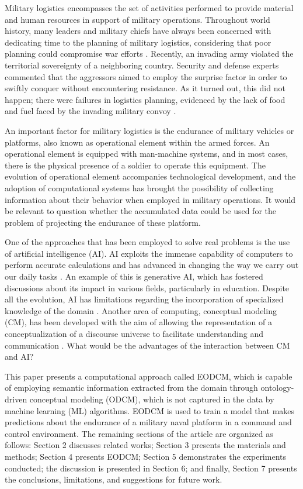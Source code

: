 \documentclass[
]{ceurart}
\begin{document}
Military logistics encompasses the set of activities performed to provide material and human resources in support of military operations. Throughout world history, many leaders and military chiefs have always been concerned with dedicating time to the planning of military logistics, considering that poor planning could compromise war efforts \cite{simon2001art}. Recently, an invading army violated the territorial sovereignty of a neighboring country. Security and defense experts commented that the aggressors aimed to employ the surprise factor in order to swiftly conquer without encountering resistance. As it turned out, this did not happen; there were failures in logistics planning, evidenced by the lack of food and fuel faced by the invading military convoy \cite{comboio2023reportagem}.
\par An important factor for military logistics is the endurance of military vehicles or platforms, also known as operational element within the armed forces. An operational element is equipped with man-machine systems, and in most cases, there is the physical presence of a soldier to operate this equipment. The evolution of operational element accompanies technological development, and the adoption of computational systems has brought the possibility of collecting information about their behavior when employed in military operations. It would be relevant to question whether the accumulated data could be used for the problem of projecting the endurance of these platform.
\par One of the approaches that has been employed to solve real problems is the use of artificial intelligence (AI). AI exploits the immense capability of computers to perform accurate calculations and has advanced in changing the way we carry out our daily tasks \cite{russell2013IA}. An example of this is generative AI, which has fostered discussions about its impact in various fields, particularly in education. Despite all the evolution, AI has limitations regarding the incorporation of specialized knowledge of the domain \cite{bork2023conceptual}. Another area of computing, conceptual modeling (CM), has been developed with the aim of allowing the representation of a conceptualization of a discourse universe to facilitate understanding and communication \cite{mylopoulos1992conceptual}. What would be the advantages of the interaction between CM and AI?
\par This paper presents a computational approach called EODCM, which is capable of employing semantic information extracted from the domain through ontology-driven conceptual modeling (ODCM), which is not captured in the data by machine learning (ML) algorithms. EODCM is used to train a model that makes predictions about the endurance of a military naval platform in a command and control environment. The remaining sections of the article are organized as follows: Section 2 discusses related works; Section 3 presents the materials and methods; Section 4 presents EODCM; Section 5 demonstrates the experiments conducted; the discussion is presented in Section 6; and finally, Section 7 presents the conclusions, limitations, and suggestions for future work.
\end{document}
